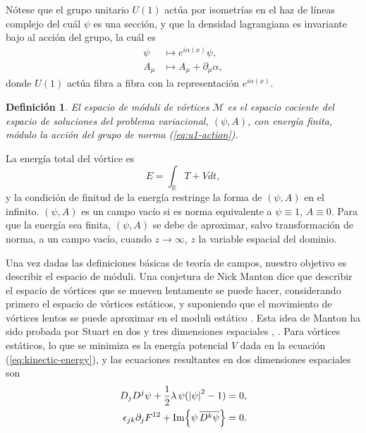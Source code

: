 \documentclass[spanish]{amsart}
\newtheorem*{definition}{Definición}
\newcommand*{\R}{\mathbb{R}}
\newcommand*{\del}{\partial}
\newcommand*{\moduli}{\mathcal{M}}
\begin{document}
Nótese que el grupo unitario \(U(1) \) actúa por isometrías en el haz
de líneas complejo del cuál \(\psi \) es una sección, y que la
densidad lagrangiana es invariante bajo al acción del grupo, la cuál
es
\begin{equation}
\label{eq:u1-action}
\begin{split}
  \psi &\mapsto e^{i\alpha(x)}\psi,\\
  A_{\mu} &\mapsto A_{\mu} + \del_{\mu}\alpha,
\end{split}
\end{equation}
donde \(U(1) \) actúa fibra a fibra con la representación
\(e^{i\alpha(x)}\).

\begin{definition}
  El espacio de móduli de vórtices  \(\moduli \) es el espacio
  cociente del espacio de soluciones del problema variacional, \((\psi,
  A) \), con energía finita, módulo la acción del grupo de norma
  (\ref{eq:u1-action}).
\end{definition}

La energía total del vórtice es
\[
E = \int_{\R}T + V dt,
\]
y la condición de finitud de la energía restringe la forma de \((\psi,
A) \) en el infinito. \((\psi, A )\) es un campo vacío si es norma
equivalente a \( \psi \equiv 1\), \(A \equiv 0 \). Para que la energía
sea finita, \((\psi, A) \) se debe de aproximar, salvo transformación
de norma, a un campo vacío, cuando \(z \to \infty \), \(z \) la
variable espacial del dominio.

Una vez dadas las definiciones básicas de teoría de campos, nuestro objetivo es describir el espacio de móduli. Una conjetura de
Nick Manton dice que describir el espacio de vórtices que se
mueven lentamente se puede hacer, considerando primero el espacio de
vórtices estáticos, y suponiendo que el movimiento de vórtices lentos
se puede aproximar en el moduli estático \cite{manton198254}. Esta
idea de Manton ha sido probada por Stuart en dos y tres dimensiones
espaciales \cite{stuart1994geodesic}, \cite{stuart1994dynamics}. Para
vórtices estáticos, lo que se minimiza es la energía potencial \(V \)
dada en la ecuación (\ref{eq:kinectic-energy}), y las ecuaciones
resultantes en dos dimensiones espaciales son
\begin{equation}
  \label{eq:static-euler-lagrange}  
  \begin{split}
    D_jD^j\psi + \frac{1}{2}\lambda\,\psi(\abs{\psi}^2 - 1) &= 0,\\
    \epsilon_{jk}\del_jF^{12} + \Im{\psi\,\overline{D^{k}\psi}} &= 0.
  \end{split}
\end{equation}
\end{document}
